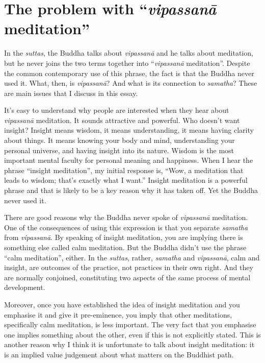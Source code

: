 \documentclass[12pt,openany]{book}
\begin{document}
\chapter*{The problem with “\textit{vipassanā} meditation”}

\pagestyle{fancy}

In the \textit{suttas}, the Buddha talks about \textit{vipassanā} and he talks about meditation, but he never joins the two terms together into “\textit{vipassanā} meditation”. Despite the common contemporary use of this phrase, the fact is that the Buddha never used it. What, then, is \textit{vipassanā}? And what is its connection to \textit{samatha}? These are main issues that I discuss in this essay.

It’s easy to understand why people are interested when they hear about \textit{vipassanā} meditation. It sounds attractive and powerful. Who doesn’t want insight? Insight means wisdom, it means understanding, it means having clarity about things. It means knowing your body and mind, understanding your personal universe, and having insight into its nature. Wisdom is the most important mental faculty for personal meaning and happiness. When I hear the phrase “insight meditation”, my initial response is, “Wow, a meditation that leads to wisdom; that’s exactly what I want.” Insight meditation is a powerful phrase and that is likely to be a key reason why it has taken off. Yet the Buddha never used it.

There are good reasons why the Buddha never spoke of \textit{vipassanā} meditation. One of the consequences of using this expression is that you separate \textit{samatha} from \textit{vipassanā}. By speaking of insight meditation, you are implying there is something else called calm meditation. But the Buddha didn't use the phrase “calm meditation”, either. In the \textit{suttas}, rather, \textit{samatha} and \textit{vipassanā}, calm and insight, are outcomes of the practice, not practices in their own right. And they are normally conjoined, constituting two aspects of the same process of mental development.

Moreover, once you have established the idea of insight meditation and you emphasise it and give it pre-eminence, you imply that other meditations, specifically calm meditation, is less important. The very fact that you emphasise one implies something about the other, even if this is not explicitly stated. This is another reason why I think it is unfortunate to talk about insight meditation: it is an implied value judgement about what matters on the Buddhist path.
\end{document}
